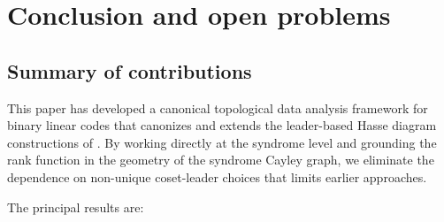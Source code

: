 \documentclass[11pt,twoside,leqno]{article}
\theoremstyle{definition}
\theoremstyle{plain}
\theoremstyle{remark}
\begin{document}
\section{Conclusion and open problems}\label{sec:conclusion}

\subsection{Summary of contributions}

This paper has developed a canonical topological data analysis framework for binary linear codes
that canonizes and extends the leader-based Hasse diagram constructions of
\cite{DelgadoCastilloHolguin2022,DelgadoThesis2021}. By working directly at the syndrome level
and grounding the rank function in the geometry of the syndrome Cayley graph, we eliminate the
dependence on non-unique coset-leader choices that limits earlier approaches.

The principal results are:
\end{document}
